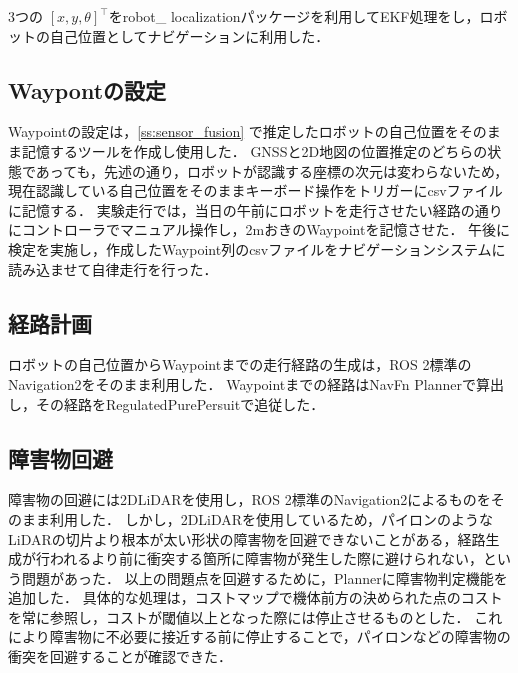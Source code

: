 \documentclass[platex,dvipdfmx]{rbproceedings}
\begin{document}
3つの $\left[ x, y, \theta \right] ^\top$をrobot\_ localization\cite{localization}パッケージを利用してEKF処理をし，ロボットの自己位置としてナビゲーションに利用した．

\subsection{Waypontの設定}
Waypointの設定は，\ref{ss:sensor_fusion} で推定したロボットの自己位置をそのまま記憶するツールを作成し使用した．
GNSSと2D地図の位置推定のどちらの状態であっても，先述の通り，ロボットが認識する座標の次元は変わらないため，現在認識している自己位置をそのままキーボード操作をトリガーにcsvファイルに記憶する．
実験走行では，当日の午前にロボットを走行させたい経路の通りにコントローラでマニュアル操作し，2mおきのWaypointを記憶させた．
午後に検定を実施し，作成したWaypoint列のcsvファイルをナビゲーションシステムに読み込ませて自律走行を行った．

\subsection{経路計画}
ロボットの自己位置からWaypointまでの走行経路の生成は，ROS 2標準のNavigation2\cite{nav2}をそのまま利用した．
Waypointまでの経路はNavFn Planner\cite{navfn}で算出し，その経路をRegulatedPurePersuit\cite{rrp}で追従した．

\subsection{障害物回避} \label{ss:avoidance}
障害物の回避には2DLiDARを使用し，ROS 2標準のNavigation2によるものをそのまま利用した．
しかし，2DLiDARを使用しているため，パイロンのようなLiDARの切片より根本が太い形状の障害物を回避できないことがある，経路生成が行われるより前に衝突する箇所に障害物が発生した際に避けられない，という問題があった．
以上の問題点を回避するために，Plannerに障害物判定機能を追加した．
具体的な処理は，コストマップで機体前方の決められた点のコストを常に参照し，コストが閾値以上となった際には停止させるものとした．
これにより障害物に不必要に接近する前に停止することで，パイロンなどの障害物の衝突を回避することが確認できた．
\end{document}
